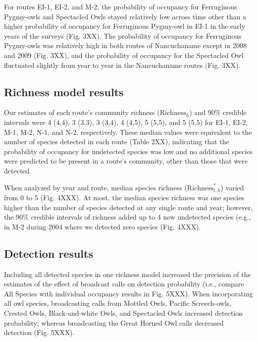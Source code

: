 \documentclass[
]{article}
\begin{document}
For routes EI-1, EI-2, and M-2, the probability of occupancy for
Ferruginous Pygmy-owls and Spectacled Owls stayed relatively low across
time other than a higher probability of occupancy for Ferruginous
Pygmy-owl in EI-1 in the early years of the surveys (Fig. 3XX). The
probability of occupancy for Ferruginous Pygmy-owls was relatively high
in both routes of Nancuchaname except in 2008 and 2009 (Fig. 3XX), and
the probability of occupancy for the Spectacled Owl fluctuated slightly
from year to year in the Nancuchaname routes (Fig. 3XX).

\hypertarget{richness-model-results}{%
\subsection{Richness model results}\label{richness-model-results}}

Our estimates of each route's community richness
(\(\text{Richness}_{h}\)) and 90\% credible intervals were 4 (4,4), 3
(3,3), 3 (3,4), 4 (4,5), 5 (5,5), and 5 (5,5) for EI-1, EI-2, M-1, M-2,
N-1, and N-2, respectively. These median values were equivalent to the
number of species detected in each route (Table 2XX), indicating that
the probability of occupancy for undetected species was low and no
additional species were predicted to be present in a route's community,
other than those that were detected.

When analyzed by year and route, median species richness
(\(\text{Richness}^*_{t,h}\)) varied from 0 to 5 (Fig. 4XXX). At most,
the median species richness was one species higher than the number of
species detected at any single route and year; however, the 90\%
credible intervals of richness added up to 4 new undetected species
(e.g., in M-2 during 2004 where we detected zero species (Fig. 4XXX).

\hypertarget{detection-results}{%
\subsection{Detection results}\label{detection-results}}

Including all detected species in one richness model increased the
precision of the estimates of the effect of broadcast calls on detection
probability (i.e., compare All Species with individual occupancy results
in Fig. 5XXX). When incorporating all owl species, broadcasting calls
from Mottled Owls, Pacific Screech-owls, Crested Owls, Black-and-white
Owls, and Spectacled Owls increased detection probability; whereas
broadcasting the Great Horned Owl calls decreased detection (Fig. 5XXX).
\end{document}

